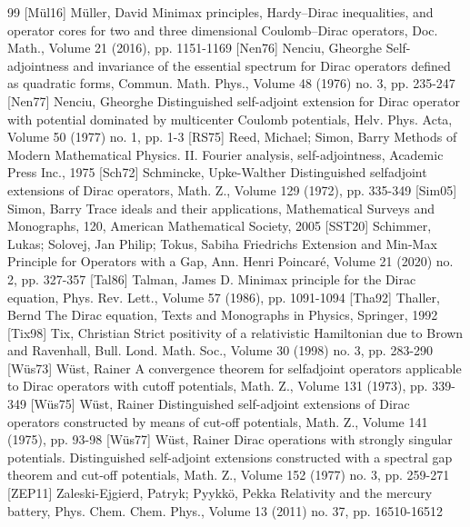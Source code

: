 \begin{thebibliography}{99}
 [Mül16] Müller, David Minimax principles, Hardy–Dirac inequalities, and operator cores for two and three dimensional Coulomb–Dirac operators, Doc. Math., Volume 21 (2016), pp. 1151-1169
 [Nen76] Nenciu, Gheorghe Self-adjointness and invariance of the essential spectrum for Dirac operators defined as quadratic forms, Commun. Math. Phys., Volume 48 (1976) no. 3, pp. 235-247
 [Nen77] Nenciu, Gheorghe Distinguished self-adjoint extension for Dirac operator with potential dominated by multicenter Coulomb potentials, Helv. Phys. Acta, Volume 50 (1977) no. 1, pp. 1-3
 [RS75] Reed, Michael; Simon, Barry Methods of Modern Mathematical Physics. II. Fourier analysis, self-adjointness, Academic Press Inc., 1975
 [Sch72] Schmincke, Upke-Walther Distinguished selfadjoint extensions of Dirac operators, Math. Z., Volume 129 (1972), pp. 335-349
 [Sim05] Simon, Barry Trace ideals and their applications, Mathematical Surveys and Monographs, 120, American Mathematical Society, 2005
 [SST20] Schimmer, Lukas; Solovej, Jan Philip; Tokus, Sabiha Friedrichs Extension and Min-Max Principle for Operators with a Gap, Ann. Henri Poincaré, Volume 21 (2020) no. 2, pp. 327-357
 [Tal86] Talman, James D. Minimax principle for the Dirac equation, Phys. Rev. Lett., Volume 57 (1986), pp. 1091-1094
 [Tha92] Thaller, Bernd The Dirac equation, Texts and Monographs in Physics, Springer, 1992
 [Tix98] Tix, Christian Strict positivity of a relativistic Hamiltonian due to Brown and Ravenhall, Bull. Lond. Math. Soc., Volume 30 (1998) no. 3, pp. 283-290
 [Wüs73] Wüst, Rainer A convergence theorem for selfadjoint operators applicable to Dirac operators with cutoff potentials, Math. Z., Volume 131 (1973), pp. 339-349
 [Wüs75] Wüst, Rainer Distinguished self-adjoint extensions of Dirac operators constructed by means of cut-off potentials, Math. Z., Volume 141 (1975), pp. 93-98
 [Wüs77] Wüst, Rainer Dirac operations with strongly singular potentials. Distinguished self-adjoint extensions constructed with a spectral gap theorem and cut-off potentials, Math. Z., Volume 152 (1977) no. 3, pp. 259-271
 [ZEP11] Zaleski-Ejgierd, Patryk; Pyykkö, Pekka Relativity and the mercury battery, Phys. Chem. Chem. Phys., Volume 13 (2011) no. 37, pp. 16510-16512
\end{thebibliography}
